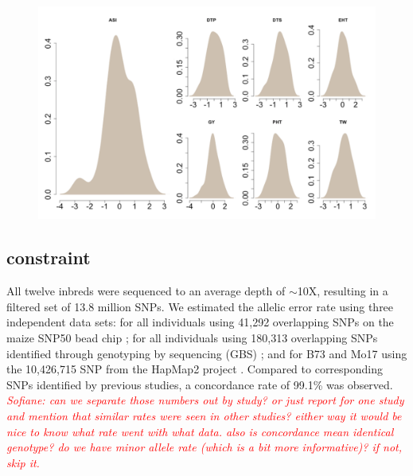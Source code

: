 \documentclass[9pt,twocolumn,twoside]{gsajnl}
\newcommand{\jri}[1]{\textcolor{red}{ \emph{ #1}} }
\begin{document}
\DIFaddbegin \begin{figure}[htbp]
\centering
\includegraphics[width=\linewidth]{Figure_pheno.pdf}
\caption{}
\label{fig:pheno}
\end{figure}



\DIFaddend \subsection*{\DIFdelbegin {}\DIFdelend \DIFaddbegin {}\DIFaddend constraint\DIFdelbegin {}\DIFdelend }

All twelve inbreds were sequenced to an average depth of $\sim$10X, resulting in a filtered set of 13.8 million SNPs. 
We estimated the allelic error rate using three independent data sets: for all individuals using 41,292 overlapping SNPs on the maize SNP50 bead chip \citep{Heerwaarden2012}; for all individuals using 180,313 overlapping SNPs identified through genotyping by sequencing (GBS) \citep{Romay2013}; and for B73 and Mo17 using the 10,426,715 SNP from the HapMap2 project \citep{Chia2012}.  \DIFdelbegin \DIFdelend Compared to corresponding SNPs identified by previous studies, a concordance rate of 99.1\% was observed. \DIFaddbegin \jri{Sofiane: can we separate those numbers out by study? or just report for one study and mention that similar rates were seen in other studies? either way it would be nice to know what rate went with what data. also is concordance mean identical genotype? do we have minor allele rate (which is a bit more informative)? if not, skip it.} 
\DIFaddend 
\end{document}
